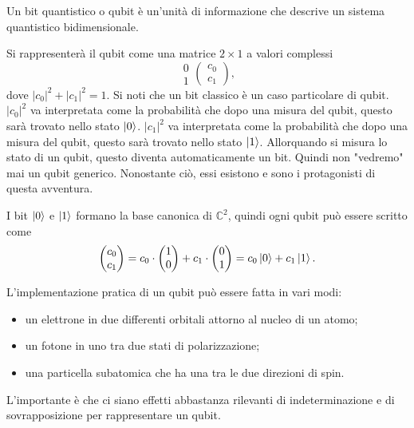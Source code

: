Un bit quantistico o qubit è un'unità di informazione che descrive 
un sistema quantistico bidimensionale. 

Si rappresenterà il qubit come una matrice $2\times1$ a valori complessi 
\begin{equation}
    \begin{matrix}
        0 \\ 1
    \end{matrix}
    \begin{pmatrix}
        c_0 \\ c_1
    \end{pmatrix},
\end{equation}
dove $|c_0|^2 + |c_1|^2 = 1$. Si noti che un bit classico è un caso particolare 
di qubit. $|c_0|^2$ va interpretata come la probabilità che dopo una misura del 
qubit, questo sarà trovato nello stato $\ket{0}$. $|c_1|^2$ va interpretata come 
la probabilità che dopo una misura del qubit, questo sarà trovato nello stato 
$\ket{1}$. Allorquando si misura lo stato di un qubit, questo diventa automaticamente 
un bit. Quindi non "vedremo" mai un qubit generico. Nonostante ciò, essi esistono 
e sono i protagonisti di questa avventura. 

I bit $\ket{0}$ e $\ket{1}$ formano la base canonica di $\mathbb{C}^2$, quindi 
ogni qubit può essere scritto come 
\begin{equation} \label{eq:2.3}
    \begin{pmatrix}
        c_0 \\ c_1
    \end{pmatrix}
    =
    c_0 \cdot 
    \begin{pmatrix}
        1 \\ 0
    \end{pmatrix}
    + c_1 \cdot 
    \begin{pmatrix}
        0 \\ 1
    \end{pmatrix}
    = c_0 \ket{0} + c_1 \ket{1}.
\end{equation}

L'implementazione pratica di un qubit può essere fatta in vari modi: 
\begin{itemize}
    \item un elettrone in due differenti orbitali attorno al nucleo di un atomo; 
    \item un fotone in uno tra due stati di polarizzazione; 
    \item una particella subatomica che ha una tra le due direzioni di spin. 
\end{itemize}
L'importante è che ci siano effetti abbastanza rilevanti di indeterminazione 
e di sovrapposizione per rappresentare un qubit. 

